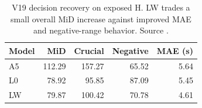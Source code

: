 \begin{table}[tbp]
\centering\small
\caption{V19 decision recovery on exposed H. LW trades a small overall MiD increase against improved MAE and negative-range behavior. Source .}
\label{tab:late_v19}
\begin{tabular}{lrrrr}
\toprule
\textbf{Model} & \textbf{MiD} & \textbf{Crucial} & \textbf{Negative} & \textbf{MAE (s)} \\
\midrule
A5 & 112.29 & 157.27 & 65.52 & 5.64 \\
L0 & 78.92 & 95.85 & 87.09 & 5.45 \\
LW & 79.87 & 100.42 & 70.78 & 4.61 \\
\bottomrule
\end{tabular}
\end{table}
